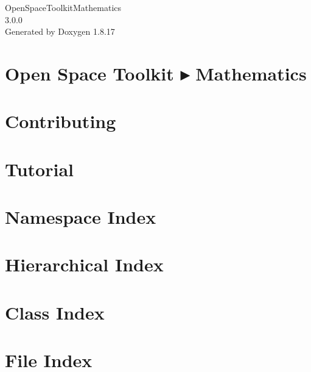 \let\mypdfximage\pdfximage\def\pdfximage{\immediate\mypdfximage}\documentclass[twoside]{book}
\newcommand{\+}{\discretionary{\mbox{\scriptsize$\hookleftarrow$}}{}{}}
\newcommand{\clearemptydoublepage}{%
  \newpage{\pagestyle{empty}\cleardoublepage}%
}
\begin{document}
\hypersetup{pageanchor=false,
             bookmarksnumbered=true,
             pdfencoding=unicode
            }
\begin{titlepage}
\vspace*{7cm}
\begin{center}%
{\Large Open\+Space\+Toolkit\+Mathematics \\[1ex]\large 3.\+0.\+0 }\\
\vspace*{1cm}
{\large Generated by Doxygen 1.8.17}\\
\end{center}
\end{titlepage}
\clearemptydoublepage
{}
\tableofcontents
\clearemptydoublepage
{}
\hypersetup{pageanchor=true}

\chapter{Open Space Toolkit ▸ Mathematics}
\label{index}\hypertarget{index}{}
\chapter{Contributing}
\label{md__c_o_n_t_r_i_b_u_t_i_n_g}

\chapter{Tutorial}
\label{md_docs__tutorial}

\chapter{Namespace Index}

\chapter{Hierarchical Index}

\chapter{Class Index}

\chapter{File Index}

\end{document}
